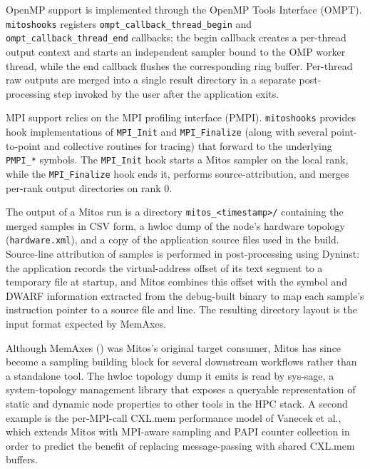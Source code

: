 OpenMP support is implemented through the OpenMP Tools Interface (OMPT)\cite{ompt}. \texttt{mitoshooks} registers \texttt{ompt\_callback\_thread\_begin} and \texttt{ompt\_callback\_thread\_end} callbacks; the begin callback creates a per-thread output context and starts an independent sampler bound to the OMP worker thread, while the end callback flushes the corresponding ring buffer. Per-thread raw outputs are merged into a single result directory in a separate post-processing step invoked by the user after the application exits.\cite{mitosGh,Vanecek2026}

MPI support relies on the MPI profiling interface (PMPI)\cite{mpiStandard}. \texttt{mitoshooks} provides hook implementations of \texttt{MPI\_Init} and \texttt{MPI\_Finalize} (along with several point-to-point and collective routines for tracing) that forward to the underlying \texttt{PMPI\_*} symbols. The \texttt{MPI\_Init} hook starts a Mitos sampler on the local rank, while the \texttt{MPI\_Finalize} hook ends it, performs source-attribution, and merges per-rank output directories on rank 0\cite{mitosGh,Vanecek2026}.

The output of a Mitos run is a directory \texttt{mitos\_<timestamp>/} containing the merged samples in CSV form, a hwloc\cite{hwloc} dump of the node's hardware topology (\texttt{hardware.xml}), and a copy of the application source files used in the build. Source-line attribution of samples is performed in post-processing using Dyninst\cite{dyninst}: the application records the virtual-address offset of its text segment to a temporary file at startup, and Mitos combines this offset with the symbol and DWARF information extracted from the debug-built binary to map each sample's instruction pointer to a source file and line\cite{mitosGh}. The resulting directory layout is the input format expected by MemAxes.

Although MemAxes () was Mitos's original target consumer, Mitos has since become a sampling building block for several downstream workflows rather than a standalone tool. The hwloc topology dump it emits is read by sys-sage\cite{Vanecek2024}, a system-topology management library that exposes a queryable representation of static and dynamic node properties to other tools in the HPC stack. A second example is the per-MPI-call CXL.mem performance model of Vanecek et al.\cite{Vanecek2026}, which extends Mitos with MPI-aware sampling and PAPI\cite{PAPI} counter collection in order to predict the benefit of replacing message-passing with shared CXL.mem buffers.

